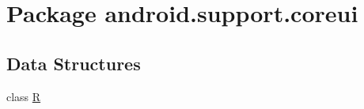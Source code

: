 \hypertarget{namespaceandroid_1_1support_1_1coreui}{}\section{Package android.\+support.\+coreui}
\label{namespaceandroid_1_1support_1_1coreui}
\subsection*{Data Structures}
\begin{DoxyCompactItemize}
\item 
class \mbox{\hyperlink{classandroid_1_1support_1_1coreui_1_1_r}{R}}
\end{DoxyCompactItemize}
